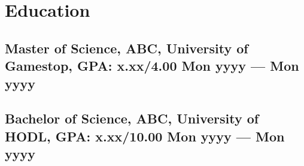 \section{Education }
\subsection*{Master of Science, ABC, {\normalsize \normalfont University of Gamestop, GPA: x.xx/4.00} \hfill Mon yyyy --- Mon yyyy} 
\vspace{0.1cm}
\subsection*{Bachelor of Science, ABC, {\normalsize \normalfont University of HODL, GPA: x.xx/10.00} \hfill Mon yyyy --- Mon yyyy} 
\vspace{0.2cm}